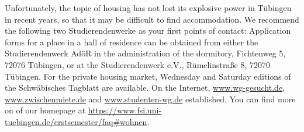 Unfortunately, the topic of housing has not lost its explosive power in Tübingen in recent years,
so that it may be difficult to find accommodation. We recommend the following two Studierendenwerke as your first points of contact:
Application forms for a place in a hall of residence can be obtained from either the Studierendenwerk AdöR in the administration of the dormitory,
Fichtenweg 5, 72076 Tübingen, or at the Studierendenwerk e.V., Rümelinstraße 8, 72070 Tübingen. For the private housing market, Wednesday and Saturday
editions of the Schwäbisches Tagblatt are available.
On the Internet, \url{www.wg-gesucht.de}, \url{www.zwischenmiete.de} and \url{www.studenten-wg.de} established.
You can find more on of our homepage at \url{https://www.fsi.uni-tuebingen.de/erstsemester/faq\#wohnen}.
\else

